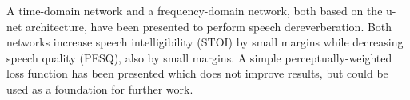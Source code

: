 A time-domain network and a frequency-domain network, both based on the u-net architecture, have been presented to perform speech dereverberation. Both networks increase speech intelligibility (\ac{STOI}) by small margins while decreasing speech quality (\ac{PESQ}), also by small margins. A simple perceptually-weighted loss function has been presented which does not improve results, but could be used as a foundation for further work.
